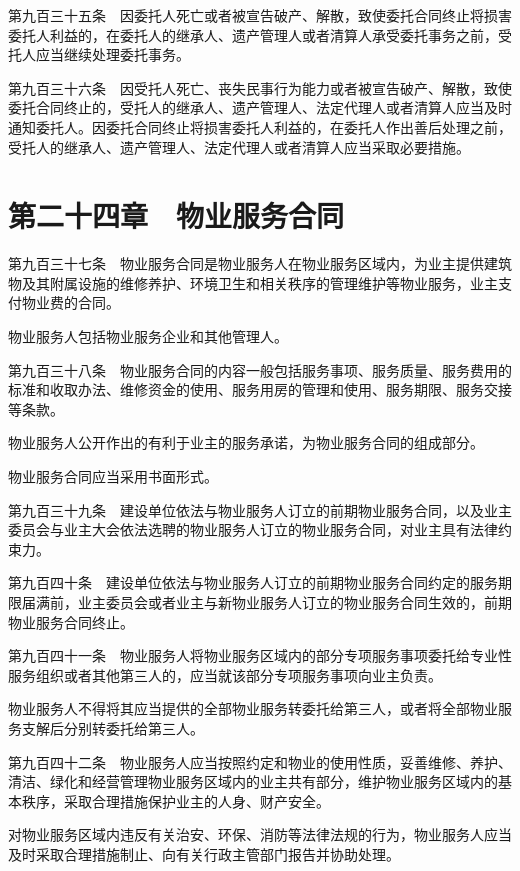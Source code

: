 \documentclass[UTF8,12pt,a4paper]{ctexbook}
\begin{document}
第九百三十五条　因委托人死亡或者被宣告破产、解散，致使委托合同终止将损害委托人利益的，在委托人的继承人、遗产管理人或者清算人承受委托事务之前，受托人应当继续处理委托事务。

第九百三十六条　因受托人死亡、丧失民事行为能力或者被宣告破产、解散，致使委托合同终止的，受托人的继承人、遗产管理人、法定代理人或者清算人应当及时通知委托人。因委托合同终止将损害委托人利益的，在委托人作出善后处理之前，受托人的继承人、遗产管理人、法定代理人或者清算人应当采取必要措施。

\section*{第二十四章　物业服务合同}

第九百三十七条　物业服务合同是物业服务人在物业服务区域内，为业主提供建筑物及其附属设施的维修养护、环境卫生和相关秩序的管理维护等物业服务，业主支付物业费的合同。

物业服务人包括物业服务企业和其他管理人。

第九百三十八条　物业服务合同的内容一般包括服务事项、服务质量、服务费用的标准和收取办法、维修资金的使用、服务用房的管理和使用、服务期限、服务交接等条款。

物业服务人公开作出的有利于业主的服务承诺，为物业服务合同的组成部分。

物业服务合同应当采用书面形式。

第九百三十九条　建设单位依法与物业服务人订立的前期物业服务合同，以及业主委员会与业主大会依法选聘的物业服务人订立的物业服务合同，对业主具有法律约束力。

第九百四十条　建设单位依法与物业服务人订立的前期物业服务合同约定的服务期限届满前，业主委员会或者业主与新物业服务人订立的物业服务合同生效的，前期物业服务合同终止。

第九百四十一条　物业服务人将物业服务区域内的部分专项服务事项委托给专业性服务组织或者其他第三人的，应当就该部分专项服务事项向业主负责。

物业服务人不得将其应当提供的全部物业服务转委托给第三人，或者将全部物业服务支解后分别转委托给第三人。

第九百四十二条　物业服务人应当按照约定和物业的使用性质，妥善维修、养护、清洁、绿化和经营管理物业服务区域内的业主共有部分，维护物业服务区域内的基本秩序，采取合理措施保护业主的人身、财产安全。

对物业服务区域内违反有关治安、环保、消防等法律法规的行为，物业服务人应当及时采取合理措施制止、向有关行政主管部门报告并协助处理。
\end{document}
